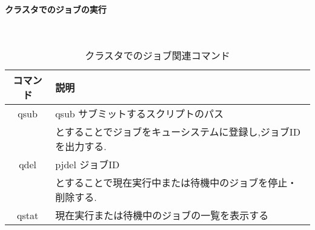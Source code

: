 \paragraph{クラスタでのジョブの実行}~\\
\begin{table}[htb]
  \begin{center}
    \caption {クラスタでのジョブ関連コマンド}
    \begin{tabular}{|c|p{12cm}|}
      \hline
      コマンド & 説明 \\ \hline
      qsub & qsub サブミットするスクリプトのパス\\
           & とすることでジョブをキューシステムに登録し,ジョブIDを出力する.\\ \hline
      qdel & pjdel ジョブID\\
           & とすることで現在実行中または待機中のジョブを停止・削除する.\\ \hline
      qstat & 現在実行または待機中のジョブの一覧を表示する\\ \hline
    \end{tabular}
  \end{center}
\end{table}~\\

